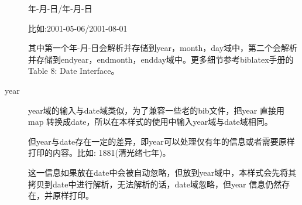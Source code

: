 \begin{description}
      年-月-日/年-月-日

      比如:2001-05-06/2001-08-01

      其中第一个年-月-日会解析并存储到year，month，day域中，第二个会解析并存储到endyear，endmonth，endday域中。更多细节参考biblatex手册的Table 8: Date Interface。

  \item[year] year域的输入与date域类似，为了兼容一些老的bib文件，把year 直接用map 转换成date，所以在本样式的使用中输入year域与date域相同。

      但year与date存在一定的差异，即year可以处理仅有年的信息或者需要原样打印的内容。比如:
      1881(清光绪七年)。

      这一信息如果放在date中会被自动忽略，但放到year域中，本样式会先将其拷贝到date中进行解析，无法解析的话，date域忽略，但year 信息仍然存在，并原样打印。


\end{description}
